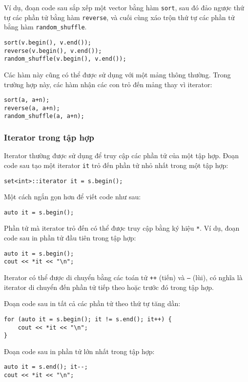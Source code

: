Ví dụ, đoạn code sau sắp xếp một vector
bằng hàm \texttt{sort},
sau đó đảo ngược thứ tự các phần tử bằng hàm
\texttt{reverse}, và cuối cùng xáo trộn thứ tự
các phần tử bằng hàm \texttt{random\_shuffle}.


\begin{lstlisting}
sort(v.begin(), v.end());
reverse(v.begin(), v.end());
random_shuffle(v.begin(), v.end());
\end{lstlisting}

Các hàm này cũng có thể được sử dụng với một mảng thông thường.
Trong trường hợp này, các hàm nhận các con trỏ đến mảng
thay vì iterator:

\newpage
\begin{lstlisting}
sort(a, a+n);
reverse(a, a+n);
random_shuffle(a, a+n);
\end{lstlisting}

\subsubsection{Iterator trong tập hợp}

Iterator thường được sử dụng để truy cập
các phần tử của một tập hợp.
Đoạn code sau tạo một iterator
\texttt{it} trỏ đến phần tử nhỏ nhất trong một tập hợp:
\begin{lstlisting}
set<int>::iterator it = s.begin();
\end{lstlisting}
Một cách ngắn gọn hơn để viết code như sau:
\begin{lstlisting}
auto it = s.begin();
\end{lstlisting}
Phần tử mà iterator trỏ đến
có thể được truy cập bằng ký hiệu \texttt{*}.
Ví dụ, đoạn code sau in
phần tử đầu tiên trong tập hợp:

\begin{lstlisting}
auto it = s.begin();
cout << *it << "\n";
\end{lstlisting}

Iterator có thể được di chuyển bằng các toán tử
\texttt{++} (tiến) và \texttt{--} (lùi),
có nghĩa là iterator di chuyển đến phần tử
tiếp theo hoặc trước đó trong tập hợp.

Đoạn code sau in tất cả các phần tử
theo thứ tự tăng dần:
\begin{lstlisting}
for (auto it = s.begin(); it != s.end(); it++) {
    cout << *it << "\n";
}
\end{lstlisting}
Đoạn code sau in phần tử lớn nhất trong tập hợp:
\begin{lstlisting}
auto it = s.end(); it--;
cout << *it << "\n";
\end{lstlisting}

